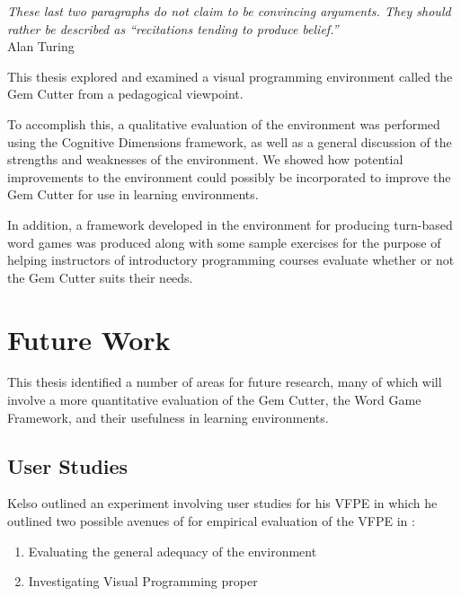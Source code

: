 \label{concl}

\begin{flushright}
\textit{These last two paragraphs do not claim to be convincing arguments. They should rather be described as ``recitations tending to produce belief.''}
\\
Alan Turing \cite{Turing50} \\
\end{flushright}

This thesis explored and examined a visual programming environment called the Gem Cutter from a pedagogical viewpoint.  

To accomplish this, a qualitative evaluation of the environment was performed using the Cognitive Dimensions framework, as well as a general discussion of the strengths and weaknesses of the environment.  We showed how potential improvements to the environment could possibly be incorporated to improve the Gem Cutter for use in learning environments. 

In addition, a framework developed in the environment for producing turn-based word games was produced along with some sample exercises for the purpose of helping instructors of introductory programming courses evaluate whether or not the Gem Cutter suits their needs.

\section{Future Work}

This thesis identified a number of areas for future research, many of which will involve a more quantitative evaluation of the Gem Cutter, the Word Game Framework, and their usefulness in learning environments.

\subsection{User Studies}

Kelso outlined an experiment involving user studies for his VFPE in which he outlined two possible avenues of for empirical evaluation of the VFPE in \cite{Kelso02}:

\begin{enumerate}
	\item Evaluating the general adequacy of the environment
	\item Investigating Visual Programming proper
\end{enumerate}

